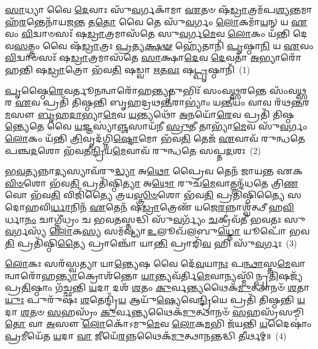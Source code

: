 \setcounter{anuvakam}{0}
\-\ul{𑌸𑌾}\-𑌧𑍍𑌯𑌾 𑌵𑍈 \ul{𑌦𑍇}\-𑌵𑌾𑌃 𑌸𑍁᳴\-\ul{𑌵}\-𑌰𑍍𑌗𑌕𑌾᳴𑌮𑌾 \ul{𑌏}\-𑌤𑍞 𑌷᳴\-\ul{𑌡𑍍𑌰𑌾}\-𑌤𑍍𑌰𑌮᳴𑌪\-\ul{𑌶𑍍𑌯}\-𑌨𑍍𑌤𑌮𑌾𑌹᳴\-\ul{𑌰}\-𑌨𑍍𑌤𑍇𑌨𑌾᳴𑌯𑌜\-\ul{𑌨𑍍𑌤} 𑌤\-\ul{𑌤𑍋} 𑌵𑍈 𑌤𑍇 𑌸𑍁᳴\-\ul{𑌵}\-𑌰𑍍𑌗𑌂 \ul{𑌲𑍋}\-𑌕𑌮𑌾᳴\-\ul{𑌯}\-𑌨𑍍 𑌯 \ul{𑌏}\-𑌵𑌂 \ul{𑌵𑌿}\-𑌦𑍍𑌵𑌾𑍞𑌸𑌃᳴ 𑌷\-\ul{𑌡𑍍𑌰𑌾}\-𑌤𑍍𑌰𑌮𑌾𑌸᳴𑌤𑍇 𑌸𑍁\-\ul{𑌵}\-𑌰𑍍𑌗\-\ul{𑌮𑍇}\-𑌵 \ul{𑌲𑍋}\-𑌕𑌂 𑌯᳴𑌨𑍍𑌤𑌿 𑌦𑍇𑌵\-\ul{𑌸}\-𑌤𑍍𑌤𑍍𑌰𑌂 𑌵𑍈 𑌷᳴\-\ul{𑌡𑍍𑌰𑌾}\-𑌤𑍍𑌰𑌃 \ul{𑌪𑍍𑌰}\-𑌤𑍍𑌯\-\ul{𑌕𑍍𑌷}\-\-\ul{𑍟} 𑌹𑍍𑌯𑍇᳴𑌤𑌾𑌨𑌿᳴ \ul{𑌪𑍃}\-𑌷𑍍𑌠𑌾\-\ul{𑌨𑌿} 𑌯 \ul{𑌏}\-𑌵𑌂 \ul{𑌵𑌿}\-𑌦𑍍𑌵𑌾𑍞𑌸𑌃᳴ 𑌷\-\ul{𑌡𑍍𑌰𑌾}\-𑌤𑍍𑌰𑌮𑌾𑌸᳴𑌤𑍇 \ul{𑌸𑌾}\-𑌕𑍍𑌷𑌾\-\ul{𑌦𑍇}\-𑌵 \ul{𑌦𑍇}\-𑌵𑌤𑌾᳴ \ul{𑌅}\-𑌭𑍍𑌯𑌾𑌰𑍋᳴𑌹𑌨𑍍𑌤𑌿 𑌷\-\ul{𑌡𑍍𑌰𑌾}\-𑌤𑍍𑌰𑍋 𑌭᳴𑌵\-\ul{𑌤𑌿} 𑌷𑌡𑍍𑌵𑌾 \ul{𑌋}\-𑌤\-\ul{𑌵𑌃} 𑌷\-\ul{𑌟𑍍𑌪𑍃}\-𑌷𑍍𑌠𑌾𑌨𑌿᳴~(1)

\-\ul{𑌪𑍃}\-𑌷𑍍𑌠𑍈\-\ul{𑌰𑍇}\-𑌵𑌰𑍍𑌤𑍂\-\ul{𑌨}\-𑌨𑍍𑌵𑌾𑌰𑍋᳴𑌹\-\ul{𑌨𑍍𑌤𑍍𑌯𑍃}\-𑌤𑍁𑌭𑌿𑌃᳴ 𑌸𑌂𑌵\-\ul{𑌥𑍍𑌸}\-𑌰𑌨𑍍𑌤𑍇 𑌸𑌂᳴𑌵\-\ul{𑌥𑍍𑌸}\-𑌰 \ul{𑌏}\-𑌵 𑌪𑍍𑌰𑌤𑌿᳴ 𑌤𑌿𑌷𑍍𑌠𑌨𑍍𑌤𑌿 𑌬𑍃𑌹𑌦𑍍𑌰𑌥\-\ul{𑌨𑍍𑌤}\-𑌰𑌾\-𑌭𑍍𑌯𑌾𑌂॑ 𑌯\-\ul{𑌨𑍍𑌤𑍀}\-𑌯𑌂 𑌵𑌾𑌵 𑌰᳴𑌥\-\ul{𑌨𑍍𑌤}\-𑌰\-\ul{𑌮}\-𑌸𑍗 \ul{𑌬𑍃}\-𑌹\-\ul{𑌦𑌾}\-𑌭𑍍𑌯𑌾\-\ul{𑌮𑍇}\-𑌵 \ul{𑌯}\-𑌨𑍍𑌤𑍍𑌯𑌥𑍋᳴ \ul{𑌅}\-𑌨𑌯𑍋᳴\-\ul{𑌰𑍇}\-𑌵 𑌪𑍍𑌰𑌤𑌿᳴ 𑌤𑌿𑌷𑍍𑌠\-\ul{𑌨𑍍𑌤𑍍𑌯𑍇}\-𑌤𑍇 𑌵𑍈 \ul{𑌯}\-𑌜𑍍𑌞𑌸𑍍𑌯𑌾॑\-\ul{𑌞𑍍𑌜}\-𑌸𑌾𑌯᳴𑌨𑍀 \ul{𑌸𑍍𑌰𑍁}\-𑌤𑍀 𑌤𑌾𑌭𑍍𑌯𑌾᳴\-\ul{𑌮𑍇}\-𑌵 𑌸𑍁᳴\-\ul{𑌵}\-𑌰𑍍𑌗𑌂 \ul{𑌲𑍋}\-𑌕𑌂 𑌯᳴𑌨𑍍𑌤𑌿 \ul{𑌤𑍍𑌰𑌿}\-𑌵𑍃𑌦᳴𑌗𑍍𑌨𑌿\-\ul{𑌷𑍍𑌟𑍋}\-𑌮𑍋 𑌭᳴𑌵\-\ul{𑌤𑌿} 𑌤𑍇𑌜᳴ \ul{𑌏}\-𑌵𑌾𑌵᳴ 𑌰𑍁𑌨𑍍𑌧𑌤𑍇 𑌪𑌞𑍍𑌚\-\ul{𑌦}\-𑌶𑍋 𑌭᳴𑌵𑌤𑍀\-\ul{𑌨𑍍𑌦𑍍𑌰𑌿}\-𑌯\-\ul{𑌮𑍇}\-𑌵𑌾𑌵᳴ 𑌰𑍁𑌨𑍍𑌧𑌤𑍇 𑌸𑌪𑍍𑌤\-\ul{𑌦}\-𑌶𑌃~(2)

\-\ul{𑌭}\-\-\ul{𑌵}\-\-\ul{𑌤𑍍𑌯}\-𑌨𑍍𑌨𑌾\-\ul{𑌦𑍍𑌯}\-𑌸𑍍𑌯𑌾𑌵᳴𑌰𑍁\-\ul{𑌦𑍍𑌧𑍍𑌯𑌾} 𑌅\-\ul{𑌥𑍋} 𑌪𑍍𑌰𑍈𑌵 𑌤𑍇𑌨᳴ 𑌜𑌾𑌯𑌨𑍍𑌤 𑌏𑌕\-\ul{𑌵𑌿}\-\-\ul{𑍞}\-𑌶𑍋 𑌭᳴𑌵\-\ul{𑌤𑌿} 𑌪𑍍𑌰𑌤𑌿᳴𑌷𑍍𑌠𑌿\-\ul{𑌤𑍍𑌯𑌾} 𑌅\-\ul{𑌥𑍋} 𑌰𑍁𑌚᳴\-\ul{𑌮𑍇}\-𑌵𑌾𑌤𑍍𑌮𑌨𑍍𑌦᳴𑌧𑌤𑍇 𑌤𑍍𑌰𑌿\-\ul{𑌣}\-𑌵𑍋 𑌭᳴𑌵\-\ul{𑌤𑌿} 𑌵𑌿𑌜𑌿᳴𑌤𑍍𑌯𑍈 𑌤𑍍𑌰𑌯\-\ul{𑌸𑍍𑌤𑍍𑌰𑌿}\-\-\ul{𑍞}\-𑌶𑍋 𑌭᳴𑌵\-\ul{𑌤𑌿} 𑌪𑍍𑌰𑌤𑌿᳴𑌷𑍍𑌠𑌿𑌤𑍍𑌯𑍈 𑌸𑌦𑍋𑌹𑌵𑌿\-\ul{𑌰𑍍𑌧𑌾}\-𑌨𑌿𑌨᳴ \ul{𑌏}\-𑌤𑍇𑌨᳴ 𑌷\-\ul{𑌡𑍍𑌰𑌾}\-𑌤𑍍𑌰𑍇𑌣᳴ 𑌯𑌜𑍇\-\ul{𑌰}\-𑌨𑍍𑌨𑌾𑌶𑍍𑌵᳴𑌤𑍍𑌥𑍀 𑌹\-\ul{𑌵𑌿}\-𑌰𑍍𑌧𑌾\-\ul{𑌨𑌂} 𑌚𑌾𑌗𑍍𑌨𑍀॑𑌧𑍍𑌰𑌂 𑌚 𑌭𑌵\-\ul{𑌤}\-𑌸𑍍𑌤𑌦𑍍𑌧𑌿 𑌸𑍁᳴\-\ul{𑌵}\-𑌰𑍍𑌗𑍍𑌯𑌂᳴ \ul{𑌚}\-𑌕𑍍𑌰𑍀𑌵᳴𑌤𑍀 𑌭𑌵𑌤𑌃 𑌸𑍁\-\ul{𑌵}\-𑌰𑍍𑌗𑌸𑍍𑌯᳴ \ul{𑌲𑍋}\-𑌕\-\ul{𑌸𑍍𑌯} 𑌸𑌮᳴𑌷𑍍𑌟𑍍𑌯𑌾 \ul{𑌉}\-𑌲𑍂𑌖᳴𑌲𑌬𑍁\-\ul{𑌧𑍍𑌨𑍋} 𑌯𑍂𑌪𑍋᳴ 𑌭𑌵\-\ul{𑌤𑌿} 𑌪𑍍𑌰𑌤𑌿᳴𑌷𑍍𑌠𑌿\-\ul{𑌤𑍍𑌯𑍈} 𑌪𑍍𑌰𑌾𑌞𑍍𑌚𑍋᳴ 𑌯𑌾\-\ul{𑌨𑍍𑌤𑌿} 𑌪𑍍𑌰𑌾𑌙𑌿᳴\-\ul{𑌵} 𑌹𑌿 𑌸𑍁᳴\-\ul{𑌵}\-𑌰𑍍𑌗𑌃~(3)

\-\ul{𑌲𑍋}\-𑌕𑌃 𑌸𑌰᳴𑌸𑍍𑌵𑌤𑍍𑌯𑌾 𑌯𑌾\-\ul{𑌨𑍍𑌤𑍍𑌯𑍇}\-𑌷 𑌵𑍈 𑌦𑍇᳴\-\ul{𑌵}\-𑌯𑌾\-\ul{𑌨𑌃} 𑌪\-\ul{𑌨𑍍𑌥𑌾}\-𑌸𑍍𑌤\-\ul{𑌮𑍇}\-𑌵𑌾𑌨𑍍𑌵𑌾𑌰𑍋᳴𑌹\-\ul{𑌨𑍍𑌤𑍍𑌯𑌾}\-𑌕𑍍𑌰𑍋𑌶᳴𑌨𑍍𑌤𑍋 \ul{𑌯𑌾}\-𑌨𑍍𑌤𑍍𑌯𑌵᳴𑌰𑍍𑌤𑌿\-\ul{𑌮𑍇}\-𑌵𑌾𑌨𑍍𑌯𑌸𑍍𑌮𑌿᳴𑌨𑍍𑌪𑍍𑌰\-\ul{𑌤𑌿}\-𑌷𑌜𑍍𑌯᳴ 𑌪𑍍𑌰\-\ul{𑌤𑌿}\-𑌷𑍍𑌠𑌾𑌂 𑌗᳴𑌚𑍍𑌛𑌨𑍍𑌤𑌿 \ul{𑌯}\-𑌦𑌾 𑌦𑌶᳴ \ul{𑌶}\-𑌤𑌂 \ul{𑌕𑍁}\-𑌰𑍍𑌵𑌨𑍍𑌤𑍍𑌯𑌥𑍈𑌕᳴\-\ul{𑌮𑍁}\-𑌤𑍍𑌥𑌾𑌨𑍞᳴ \ul{𑌶}\-𑌤𑌾\-\ul{𑌯𑍁𑌃} 𑌪𑍁𑌰𑍁᳴𑌷𑌃 \ul{𑌶}\-𑌤𑍇𑌨𑍍𑌦𑍍𑌰𑌿᳴\-\ul{𑌯} 𑌆𑌯𑍁᳴\-\ul{𑌷𑍍𑌯𑍇}\-𑌵𑍇\-\ul{𑌨𑍍𑌦𑍍𑌰𑌿}\-𑌯𑍇 𑌪𑍍𑌰𑌤𑌿᳴ 𑌤𑌿𑌷𑍍𑌠𑌨𑍍𑌤𑌿 \ul{𑌯}\-𑌦𑌾 \ul{𑌶}\-𑌤𑍞 \ul{𑌸}\-𑌹𑌸𑍍𑌰𑌂᳴ \ul{𑌕𑍁}\-𑌰𑍍𑌵𑌨𑍍𑌤𑍍𑌯𑌥𑍈𑌕᳴\-\ul{𑌮𑍁}\-𑌤𑍍𑌥𑌾𑌨𑍞᳴ \ul{𑌸}\-𑌹𑌸𑍍𑌰᳴𑌸𑌮𑍍𑌮𑌿\-\ul{𑌤𑍋} 𑌵𑌾 \ul{𑌅}\-𑌸𑍗 \ul{𑌲𑍋}\-𑌕𑍋᳴\-𑌽𑌮𑍁\-\ul{𑌮𑍇}\-𑌵 \ul{𑌲𑍋}\-𑌕\-\ul{𑌮}\-𑌭𑌿 𑌜᳴𑌯𑌨𑍍𑌤𑌿 \ul{𑌯}\-𑌦𑍈𑌷𑌾𑌂॑ \ul{𑌪𑍍𑌰}\-𑌮𑍀𑌯𑍇᳴𑌤 \ul{𑌯}\-𑌦𑌾 \ul{𑌵𑌾} 𑌜𑍀𑌯𑍇᳴\-\ul{𑌰}\-𑌨𑍍𑌨𑌥𑍈𑌕᳴\-\ul{𑌮𑍁}\-𑌤𑍍𑌥𑌾\-\ul{𑌨}\-𑌨𑍍𑌤𑌦𑍍𑌧𑌿 \ul{𑌤𑍀}\-𑌰𑍍𑌥𑌮𑍍॥~(4)

